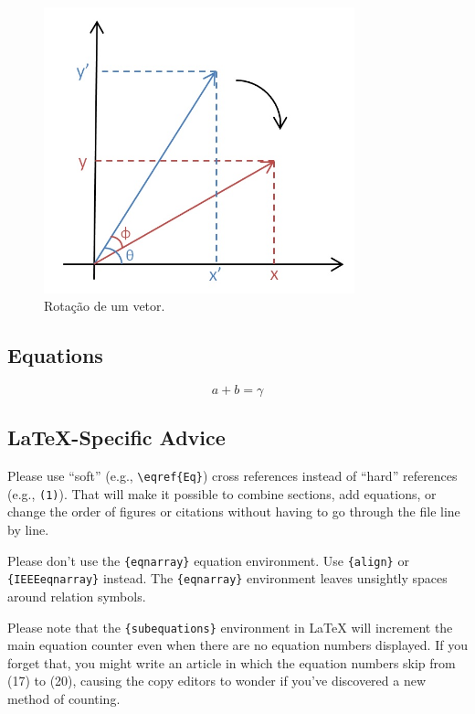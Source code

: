 \documentclass[conference]{IEEEtran}
\newcommand\largurafig{9cm}
\begin{document}
\begin{figure}[htbp]
\centerline{
    \includegraphics[width = \largurafig]{images/rotação_vetor.png}
    }
\caption{Rotação de um vetor.}
\label{fig:rotacao}
\end{figure}

\subsection{Equations}
\begin{equation}
a+b=\gamma\label{eq}
\end{equation}


\subsection{\LaTeX-Specific Advice}

Please use ``soft'' (e.g., \verb|\eqref{Eq}|) cross references instead
of ``hard'' references (e.g., \verb|(1)|). That will make it possible
to combine sections, add equations, or change the order of figures or
citations without having to go through the file line by line.

Please don't use the \verb|{eqnarray}| equation environment. Use
\verb|{align}| or \verb|{IEEEeqnarray}| instead. The \verb|{eqnarray}|
environment leaves unsightly spaces around relation symbols.

Please note that the \verb|{subequations}| environment in {\LaTeX}
will increment the main equation counter even when there are no
equation numbers displayed. If you forget that, you might write an
article in which the equation numbers skip from (17) to (20), causing
the copy editors to wonder if you've discovered a new method of
counting.
\end{document}
